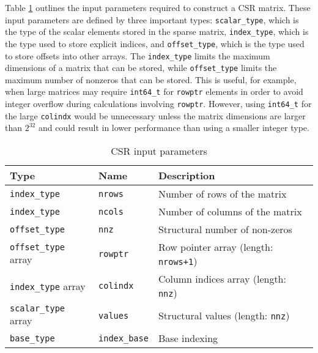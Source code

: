 \documentclass{article}
\begin{document}
Table \ref{tab:csr_param} outlines the input parameters required to construct a CSR matrix. These input parameters are defined by three important types: \texttt{scalar\_type}, which is the type of the scalar elements stored in the sparse matrix, \texttt{index\_type}, which is the type used to store explicit indices, and \texttt{offset\_type}, which is the type used to store offsets into other arrays.  The \texttt{index\_type} limits the maximum dimensions of a matrix that can be stored, while \texttt{offset\_type} limits the maximum number of nonzeros that can be stored.  This is useful, for example, when large matrices may require \texttt{int64\_t} for \texttt{rowptr} elements in order to avoid integer overflow during calculations involving \texttt{rowptr}.
However, using \texttt{int64\_t} for the large \texttt{colindx} would be unnecessary unless the matrix dimensions are larger than $2^{32}$ and could result in lower performance than using a smaller integer type.
\begin{table}[htbp]
\scriptsize
\begin{center}
     \begin{tabular}{l l l}
         \toprule
         \textbf{Type}      & \textbf{Name} & \textbf{Description} \\
         \midrule
         \texttt{index\_type} & \texttt{nrows} & Number of rows of the matrix \\
         \texttt{index\_type} & \texttt{ncols} & Number of columns of the matrix \\
         \texttt{offset\_type} & \texttt{nnz} & Structural number of non-zeros \\
         \texttt{offset\_type} array & \texttt{rowptr} & Row pointer array (length: \texttt{nrows+1}) \\
         \texttt{index\_type} array & \texttt{colindx} & Column indices array (length: \texttt{nnz}) \\
         \texttt{scalar\_type} array & \texttt{values} & Structural values (length: \texttt{nnz}) \\
         \texttt{base\_type} & \texttt{index\_base} & Base indexing\\
         \bottomrule
     \end{tabular}
\end{center}
     \caption{CSR input parameters}
    \label{tab:csr_param}
\end{table}
\end{document}
